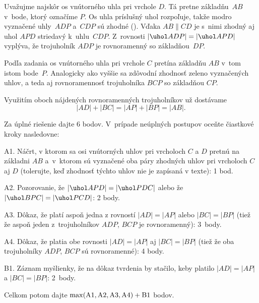 {%
Uvažujme najskôr os vnútorného uhla pri vrchole $D$.
Tá pretne základňu~$AB$ v~bode, ktorý
označíme $P$. Os uhla príslušný uhol rozpoľuje, takže modro
vyznačené uhly~$ADP$ a~$CDP$ sú zhodné (\obr). Vďaka
$AB\parallel CD$ je s~nimi zhodný aj uhol $APD$ striedavý k~uhlu~$CDP$.
Z~rovnosti $|\uhol ADP|=|\uhol APD|$ vyplýva, že trojuholník $ADP$ je
rovnoramenný so základňou~$DP$.
%

Podľa zadania os vnútorného uhla pri vrchole $C$ pretína
základňu $AB$ v~tom istom bode~$P$. Analogicky ako vyššie
sa zdôvodní zhodnosť zeleno vyznačených uhlov, a teda
aj rovnoramennosť trojuholníka $BCP$ so základňou $CP$.

Využitím oboch nájdených rovnoramenných trojuholníkov už dostávame
$$
|AD|+|BC|=|AP|+|BP|=|AB|.
$$

\schemaABC
Za úplné riešenie dajte 6 bodov. V~prípade neúplných postupov oceňte
čiastkové kroky nasledovne:

\smallskip
\item{A1.} Náčrt, v ktorom sa osi vnútorných uhlov pri vrcholoch $C$ a $D$ pretnú na základni $AB$ a~v~ktorom sú vyznačené oba páry zhodných uhlov pri vrcholoch $C$ aj $D$ (tolerujte, keď zhodnosť týchto uhlov nie je zapísaná v texte): 1 bod.
\item{A2.} Pozorovanie, že $|\uhol APD|=|\uhol PDC|$ alebo že $|\uhol BPC|=|\uhol PCD|$: 2 body.
\item{A3.} Dôkaz, že platí aspoň jedna z rovností $|AD|=|AP|$ alebo $|BC|=|BP|$ (tiež že aspoň jeden z~trojuholníkov $ADP$, $BCP$ je rovnoramenný): 3~body.
\item{A4.} Dôkaz, že platia obe rovnosti $|AD|=|AP|$ aj $|BC|=|BP|$ (tiež že oba trojuholníky $ADP$, $BCP$ sú rovnoramenné): 4 body.
\item{B1.} Záznam myšlienky, že na dôkaz tvrdenia by stačilo, keby platilo $|AD|=|AP|$ a $|BC|=|BP|$: 2~body.

\smallskip\noindent
Celkom potom dajte $\rm\max(A1,A2,A3,A4)+B1$ bodov.
\endschema
}


